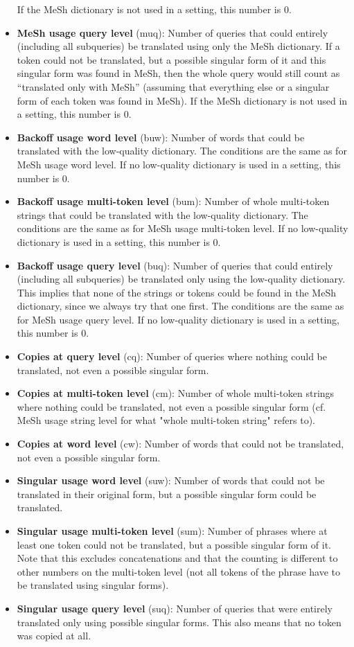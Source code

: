 \documentclass[a4paper,11pt]{article}
\begin{document}
\begin{itemize}
		If the MeSh dictionary is not used in a setting, this number is 0. 
		\item \textbf{MeSh usage query level} (muq): Number of queries that could entirely (including all subqueries) be translated using only the MeSh dictionary. If a token could not be translated, but a possible singular form of it and this singular form was found in MeSh, then the whole query would still count as ``translated only with MeSh'' (assuming that everything else or a singular form of each token was found in MeSh). If the MeSh dictionary is not used in a setting, this number is 0. 
		\item \textbf{Backoff usage word level} (buw): Number of words that could be translated with the low-quality dictionary. The conditions are the same as for MeSh usage word level. If no low-quality dictionary is used in a setting, this number is 0.
		\item \textbf{Backoff usage multi-token level} (bum): Number of whole multi-token strings that could be translated with the low-quality dictionary. The conditions are the same as for MeSh usage multi-token level. If no low-quality dictionary is used in a setting, this number is 0.
		\item \textbf{Backoff usage query level} (buq): Number of queries that could entirely (including all subqueries) be translated only using the low-quality dictionary. This implies that none of the strings or tokens could be found in the MeSh dictionary, since we always try that one first. The conditions are the same as for MeSh usage query level. If no low-quality dictionary is used in a setting, this number is 0.
		\item \textbf{Copies at query level} (cq): Number of queries where nothing could be translated, not even a possible singular form.
		\item \textbf{Copies at multi-token level} (cm): Number of whole multi-token strings where nothing could be translated, not even a possible singular form (cf. MeSh usage string level for what "whole multi-token string" refers to).
		\item \textbf{Copies at word level} (cw): Number of words that could not be translated, not even a possible singular form.
		\item \textbf{Singular usage word level} (suw): Number of words that could not be translated in their original form, but a possible singular form could be translated.
		\item \textbf{Singular usage multi-token level} (sum): Number of phrases where at least one token could not be translated, but a possible singular form of it. Note that this excludes concatenations and that the counting is different to other numbers on the multi-token level (not all tokens of the phrase have to be translated using singular forms).
		\item \textbf{Singular usage query level} (suq): Number of queries that were entirely translated only using possible singular forms. This also means that no token was copied at all.
	\end{itemize}
\end{document}
